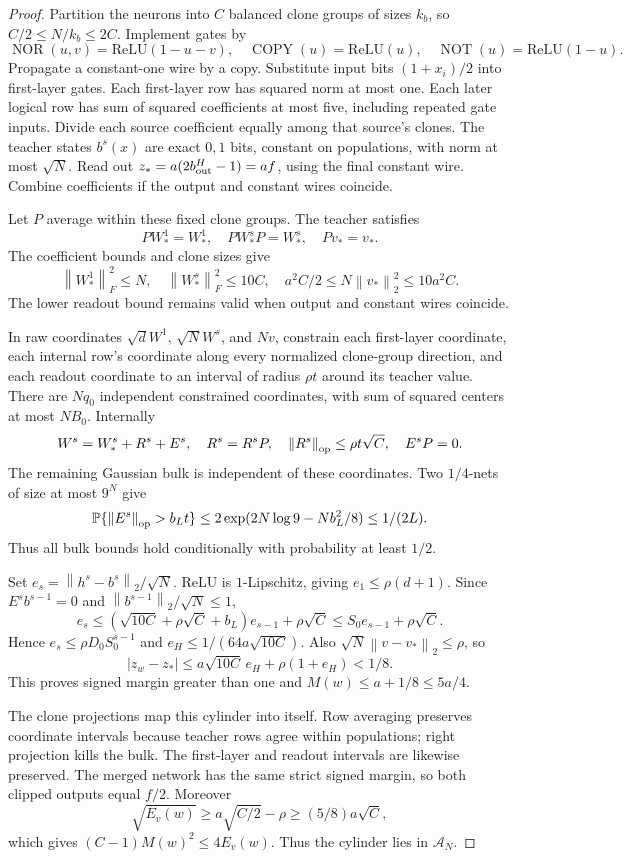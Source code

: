 \documentclass[11pt]{article}
\newcommand{\norm}[1]{\left\|#1\right\|}
\newcommand{\relu}{\mathrm{ReLU}}
\begin{document}
\begin{proof}
Partition the neurons into $C$ balanced clone groups of sizes $k_b$, so $C/2\le N/k_b\le2C$. Implement gates by
\[
 \operatorname{NOR}(u,v)=\relu(1-u-v),\quad
 \operatorname{COPY}(u)=\relu(u),\quad\operatorname{NOT}(u)=\relu(1-u).
\]
Propagate a constant-one wire by a copy. Substitute input bits $(1+x_i)/2$ into first-layer gates. Each first-layer row has squared norm at most one. Each later logical row has sum of squared coefficients at most five, including repeated gate inputs. Divide each source coefficient equally among that source's clones. The teacher states $b^s(x)$ are exact $0,1$ bits, constant on populations, with norm at most $\sqrt N$. Read out
$z_*=a(2b^H_{\rm out}-1)=af$, using the final constant wire. Combine coefficients if the output and constant wires coincide.

Let $P$ average within these fixed clone groups. The teacher satisfies
\[
 PW_*^1=W_*^1,\quad PW_*^sP=W_*^s,\quad Pv_*=v_*.
\]
The coefficient bounds and clone sizes give
\[
 \norm{W_*^1}_F^2\le N,\quad\norm{W_*^s}_F^2\le10C,\quad
 a^2C/2\le N\norm{v_*}_2^2\le10a^2C.
\]
The lower readout bound remains valid when output and constant wires coincide.

In raw coordinates $\sqrt d W^1$, $\sqrt N W^s$, and $Nv$, constrain each first-layer coordinate, each internal row's coordinate along every normalized clone-group direction, and each readout coordinate to an interval of radius $\rho t$ around its teacher value. There are $Nq_0$ independent constrained coordinates, with sum of squared centers at most $NB_0$. Internally
\[
 W^s=W_*^s+R^s+E^s,\quad R^s=R^sP,\quad
 \norm{R^s}_{\rm op}\le\rho t\sqrt C,\quad E^sP=0.
\]
The remaining Gaussian bulk is independent of these coordinates. Two $1/4$-nets of size at most $9^N$ give
\[
 \Prb\{\norm{E^s}_{\rm op}>b_Lt\}
 \le2\exp(2N\log9-Nb_L^2/8)\le1/(2L).
\]
Thus all bulk bounds hold conditionally with probability at least $1/2$.

Set $e_s=\norm{h^s-b^s}_2/\sqrt N$. ReLU is $1$-Lipschitz, giving $e_1\le\rho(d+1)$. Since $E^sb^{s-1}=0$ and $\norm{b^{s-1}}_2/\sqrt N\le1$,
\[
 e_s\le(\sqrt{10C}+\rho\sqrt C+b_L)e_{s-1}+\rho\sqrt C
 \le S_0e_{s-1}+\rho\sqrt C.
\]
Hence $e_s\le\rho D_0S_0^{s-1}$ and $e_H\le1/(64a\sqrt{10C})$. Also $\sqrt N\norm{v-v_*}_2\le\rho$, so
\[
 |z_w-z_*|\le a\sqrt{10C}\,e_H+\rho(1+e_H)<1/8.
\]
This proves signed margin greater than one and $M(w)\le a+1/8\le5a/4$.

The clone projections map this cylinder into itself. Row averaging preserves coordinate intervals because teacher rows agree within populations; right projection kills the bulk. The first-layer and readout intervals are likewise preserved. The merged network has the same strict signed margin, so both clipped outputs equal $f/2$. Moreover
\[
 \sqrt{E_v(w)}\ge a\sqrt{C/2}-\rho\ge(5/8)a\sqrt C,
\]
which gives $(C-1)M(w)^2\le4E_v(w)$. Thus the cylinder lies in $\mathcal A_N$.


\end{proof}
\end{document}
